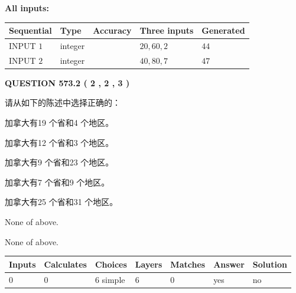 \documentclass{ctexart}
\begin{document}
   
   
   
\noindent\vspace{0.1in}\hspace{-0.08in} {\textbf{\Large{All inputs: }}}
   
   
  
  
\noindent\begin{tabular}{|l|l|l|l|l|}
\hline
 Sequential & Type & Accuracy & Three inputs & Generated \\ 
\hline
 
 
  INPUT $  1 $ & integer &  & $
 20
 , 
 60
 , 
 2
 $ & $ 44 $ 
 \\  \hline  
 
 
  INPUT $  2 $ & integer &  & $
 40
 , 
 80
 , 
 7
 $ & $ 47 $ 
 \\  \hline  
 \end{tabular}
   
   
  
\vspace{0.2in}
  
{\textbf{\Large{QUESTION
573.2 
 ( 2 , 2 , 3 )
}}}
  
  
请从如下的陈述中选择正确的：
 
 
加拿大有19 个省和4 个地区。
 
 
加拿大有12 个省和3 个地区。
 
 
加拿大有9 个省和23 个地区。
 
 
加拿大有7 个省和9 个地区。
 
 
加拿大有25 个省和31 个地区。
 
 
 None of above.
 
 
\noindent{}
 
 
 None of above.
 
 
\noindent{}
 
 
   
   
   
   
\noindent\begin{tabular}{|l|l|l|l|l|l|l|}
 \hline
Inputs & Calculates & Choices & Layers & Matches & Answer & Solution \\ \hline
 0  & 
 0  & 
 6
  simple  
  & 
 6  & 
 0  & 
  yes & 
  no 
  \\ \hline
 \end{tabular}
   
\end{document}
